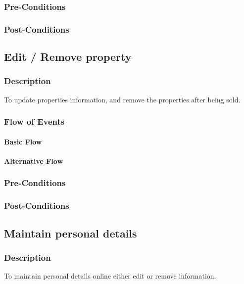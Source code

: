 \documentclass[a4paper,12pt]{article}
\begin{document}
\subsubsection{Pre-Conditions}
\subsubsection{Post-Conditions}

\subsection{Edit / Remove property}
\subsubsection{Description}
To update properties information, and remove the properties after being sold.
\subsubsection{Flow of Events}
\paragraph{Basic Flow}
\begin{itemize}
\end{itemize}

\paragraph{Alternative Flow}
\begin{itemize}
\end{itemize}

\subsubsection{Pre-Conditions}
\subsubsection{Post-Conditions}

\subsection{Maintain personal details}
\subsubsection{Description}
To maintain personal details online either edit or remove information.
\end{document}
